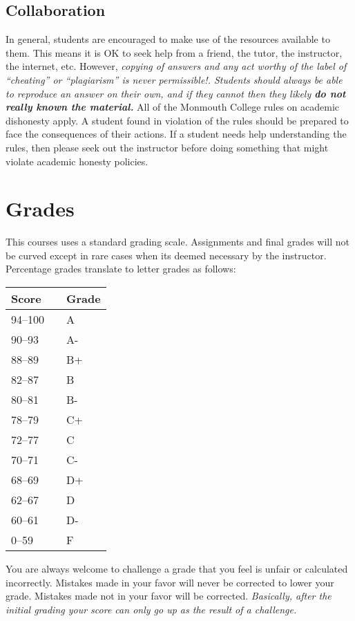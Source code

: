 \documentclass[10pt]{article}
\begin{document}
\subsection{Collaboration}

In general, students are encouraged to make use of the resources available to them.  This means it is OK to seek help from a friend, the tutor, the instructor, the internet, etc.  However, \textit{copying of answers and any act worthy of the label of ``cheating'' or ``plagiarism'' is never permissible!. Students should always be able to reproduce an answer on their own, and if they cannot then they likely \textbf{do not really known the material.}} All of the Monmouth College rules on academic dishonesty apply.  A student found in violation of the rules should be prepared to face the consequences of their actions. If a student needs help understanding the rules, then please seek out the instructor before doing something that might violate academic honesty policies.

\section{Grades}

This courses uses a standard grading scale.  Assignments and final grades will not be curved except in rare cases when its deemed necessary by the instructor.  Percentage grades translate to letter grades as follows:

\begin{center}
\begin{small}
\begin{tabular}{lcl}
Score & & Grade \\ \toprule
94--100 & & A \\
90--93 & & A- \\
88--89 & & B+ \\
82--87 & & B \\
80--81 & & B- \\
78--79 & & C+ \\
72--77 & & C \\
70--71 & & C- \\
68--69 & & D+ \\
62--67 & & D \\
60--61 & & D- \\
0--59 & & F
\end{tabular}
\end{small}
\end{center}


You are always welcome to challenge a grade that you feel is unfair or calculated incorrectly.  Mistakes made in your favor will never be corrected to lower your grade.  Mistakes made not in your favor will be corrected.  \textit{Basically, after the initial grading your score can only go up as the result of a challenge.}
\end{document}
